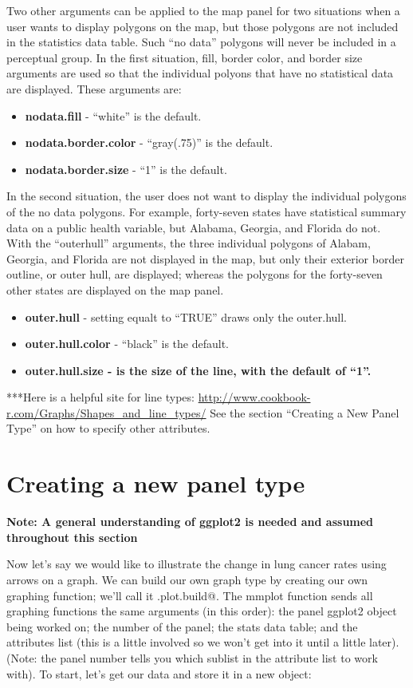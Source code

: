 \documentclass{article}
\begin{document}
Two other arguments can be applied to the map panel for two situations when a user wants to display polygons on the map, but those polygons are not included in the statistics data table.  Such ``no data'' polygons will never be included in a perceptual group.  In the first situation, fill, border color, and border size arguments are used so that the individual polyons that have no statistical data are displayed.  These arguments are:
\begin{itemize}
\item \textbf{nodata.fill} - ``white'' is the default.
\item \textbf{nodata.border.color} - ``gray(.75)'' is the default.
\item \textbf{nodata.border.size} - ``1'' is the default.
\end{itemize}
In the second situation, the user does not want to display the individual polygons of the no data polygons.  For example, forty-seven states have statistical summary data on a public health variable, but Alabama, Georgia, and Florida do not.  With the ``outerhull'' arguments, the three individual polygons of Alabam, Georgia, and Florida are not displayed in the map, but only their exterior border outline, or outer hull, are displayed; whereas the polygons for the forty-seven other states are displayed on the map panel.
\begin{itemize}
\item \textbf{outer.hull} - setting equalt to ``TRUE'' draws only the outer.hull.
\item \textbf{outer.hull.color} - ``black'' is the default.
\item \bf{outer.hull.size} - is the size of the line, with the default of ``1''.
\end{itemize}

***Here is a helpful site for line types:
\url{http://www.cookbook-r.com/Graphs/Shapes\_and\_line\_types/}
\textnormal{See the section ``Creating a New Panel Type'' on how to specify other attributes.}

\section{Creating a new panel type}
\textbf{Note: A general understanding of ggplot2 is needed and assumed throughout this section}

Now let's say we would like to illustrate the change in lung cancer rates using arrows on a graph. We can build our own graph type by creating our own graphing function; we'll call it \verb@arrow.plot.build@. The mmplot function sends all
graphing functions the same arguments (in this order): the panel ggplot2 object being worked on; the number of the panel; the stats data table; and the attributes list (this is a little involved so we won't get into it until a little later).
(Note: the panel number tells you which sublist in the attribute list to work with). To start, let's get our data and store it in a new object:
\end{document}
